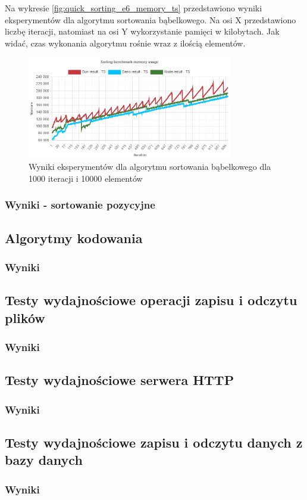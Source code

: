 Na wykresie \ref{fig:quick_sorting_e6_memory_ts} przedstawiono wyniki eksperymentów dla algorytmu sortowania bąbelkowego. Na osi X przedstawiono liczbę iteracji, natomiast na osi Y wykorzystanie pamięci w kilobytach. Jak widać, czas wykonania algorytmu rośnie wraz z ilością elementów.
\begin{figure}[H]
  \centering
  \includegraphics[width=0.8\textwidth]{Figures/sorting/quick/e6_memory_ts.png}
  \caption{Wyniki eksperymentów dla algorytmu sortowania bąbelkowego dla 1000 iteracji i 10000 elementów}
  \label{fig:bubble_sorting_e6_memory_ts}
\end{figure}

\subsubsection{Wyniki - sortowanie pozycyjne}

\subsection{Algorytmy kodowania}

\subsubsection{Wyniki}

\subsection{Testy wydajnościowe operacji zapisu i odczytu plików}

\subsubsection{Wyniki}

\subsection{Testy wydajnościowe serwera HTTP}

\subsubsection{Wyniki}

\subsection{Testy wydajnościowe zapisu i odczytu danych z bazy danych}

\subsubsection{Wyniki}